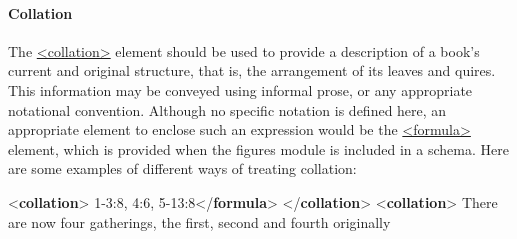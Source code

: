 \paragraph[{Collation}]{Collation}\label{msph1col}\par
The \hyperref[TEI.collation]{<collation>} element should be used to provide a description of a book's current and original structure, that is, the arrangement of its leaves and quires. This information may be conveyed using informal prose, or any appropriate notational convention. Although no specific notation is defined here, an appropriate element to enclose such an expression would be the \hyperref[TEI.formula]{<formula>} element, which is provided when the \textsf{figures} module is included in a schema. Here are some examples of different ways of treating collation: \par\bgroup{}\exampleFont \begin{shaded}\noindent\mbox{}{<\textbf{collation}>}\mbox{}\newline 
{}\mbox{}\newline 
\hspace*{1em}1-3:8, 4:6, 5-13:8{</\textbf{formula}>}\mbox{}\newline 
{}\mbox{}\newline 
{</\textbf{collation}>}\mbox{}\newline 
{<\textbf{collation}>}\mbox{}\newline 
{}There are now four gatherings, the first, second and fourth originally\mbox{}\newline 

\end{shaded}
